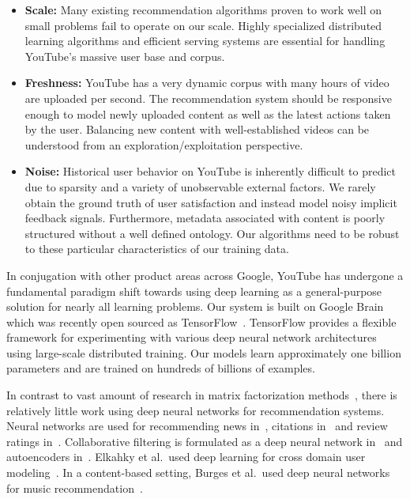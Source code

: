 \begin{itemize}
  \item \textbf{Scale:} Many existing recommendation algorithms proven to
    work well on small problems fail to operate on our scale. Highly
    specialized distributed learning algorithms and efficient serving systems
    are essential for handling YouTube's massive user base and corpus.
  \item \textbf{Freshness:} YouTube has a very dynamic corpus with many hours
    of video are uploaded per second. The recommendation system should be
    responsive enough to model newly uploaded content as well as the latest
    actions taken by the user. Balancing new content with well-established
    videos can be understood from an exploration/exploitation perspective.
  \item \textbf{Noise:} Historical user behavior on YouTube is inherently
    difficult to predict due to sparsity and a variety of unobservable
    external factors. We rarely obtain the ground truth of user satisfaction
    and instead model noisy implicit feedback signals. Furthermore, metadata
    associated with content is poorly structured without a well defined
    ontology. Our algorithms need to be robust to these particular
    characteristics of our training data.
\end{itemize}

In conjugation with other product areas across Google, YouTube has undergone
a fundamental paradigm shift towards using deep learning as a general-purpose
solution for nearly all learning problems. Our system is built on Google
Brain~\cite{dean2012large} which was recently open sourced as
TensorFlow~\cite{tensorflow2015}. TensorFlow provides a flexible framework
for experimenting with various deep neural network architectures using
large-scale distributed training. Our models learn approximately one billion
parameters and are trained on hundreds of billions of examples.

In contrast to vast amount of research in matrix factorization
methods~\cite{su2009survey}, there is relatively little work using deep
neural networks for recommendation systems. Neural networks are used for
recommending news in~\cite{oh2014personalized}, citations
in~\cite{huang2015neural} and review ratings
in~\cite{tang2015user}. Collaborative filtering is formulated as a deep
neural network in~\cite{wang2015collaborative} and autoencoders
in~\cite{sedhain2015autorec}. Elkahky et al.\ used deep learning for cross
domain user modeling~\cite{elkahky2015multi}. In a content-based setting,
Burges et al.\ used deep neural networks for music
recommendation~\cite{vandenoord2013deep}.

